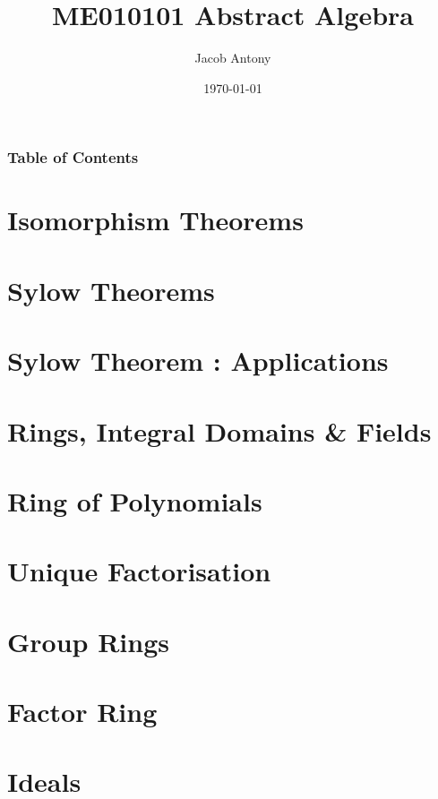 \documentclass[12pt]{beamer}
\title{ME010101 Abstract Algebra}
\author{Jacob Antony}
\date{\today}
\begin{document}
\begin{frame}
	\maketitle
\end{frame}

\begin{frame}
	\frametitle{Table of Contents}
	\tableofcontents
\end{frame}

\section{Isomorphism Theorems}



\section{Sylow Theorems}




\section{Sylow Theorem : Applications}


\section{Rings, Integral Domains \& Fields}



\section{Ring of Polynomials}


\section{Unique Factorisation}



\section{Group Rings}


\section{Factor Ring}



\section{Ideals}



\end{document}
